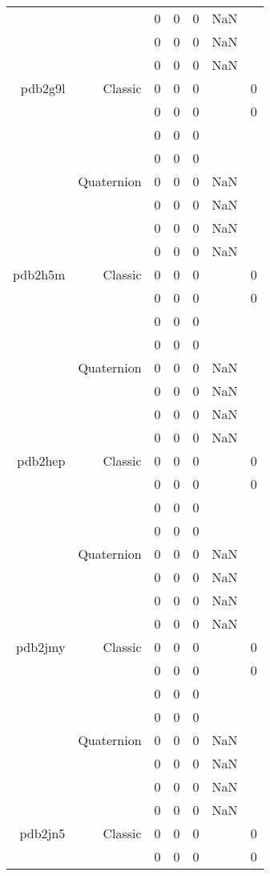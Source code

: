 \begin{xltabular}{\textwidth}{r|rcccSc}
& & 0 & 0 & 0 & NaN & \\
& & 0 & 0 & 0 & NaN & \\
& & 0 & 0 & 0 & NaN & \\ \addlinespace
pdb2g9l & Classic & 0 & 0 & 0 & & 0 \\
& & 0 & 0 & 0 & & 0 \\
& & 0 & 0 & 0 & & \\
& & 0 & 0 & 0 & & \\
& Quaternion & 0 & 0 & 0 & NaN & \\
& & 0 & 0 & 0 & NaN & \\
& & 0 & 0 & 0 & NaN & \\
& & 0 & 0 & 0 & NaN & \\ \addlinespace
pdb2h5m & Classic & 0 & 0 & 0 & & 0 \\
& & 0 & 0 & 0 & & 0 \\
& & 0 & 0 & 0 & & \\
& & 0 & 0 & 0 & & \\
& Quaternion & 0 & 0 & 0 & NaN & \\
& & 0 & 0 & 0 & NaN & \\
& & 0 & 0 & 0 & NaN & \\
& & 0 & 0 & 0 & NaN & \\ \addlinespace
pdb2hep & Classic & 0 & 0 & 0 & & 0 \\
& & 0 & 0 & 0 & & 0 \\
& & 0 & 0 & 0 & & \\
& & 0 & 0 & 0 & & \\
& Quaternion & 0 & 0 & 0 & NaN & \\
& & 0 & 0 & 0 & NaN & \\
& & 0 & 0 & 0 & NaN & \\
& & 0 & 0 & 0 & NaN & \\ \addlinespace
pdb2jmy & Classic & 0 & 0 & 0 & & 0 \\
& & 0 & 0 & 0 & & 0 \\
& & 0 & 0 & 0 & & \\
& & 0 & 0 & 0 & & \\
& Quaternion & 0 & 0 & 0 & NaN & \\
& & 0 & 0 & 0 & NaN & \\
& & 0 & 0 & 0 & NaN & \\
& & 0 & 0 & 0 & NaN & \\ \addlinespace
pdb2jn5 & Classic & 0 & 0 & 0 & & 0 \\
& & 0 & 0 & 0 & & 0 \\

\end{xltabular}
